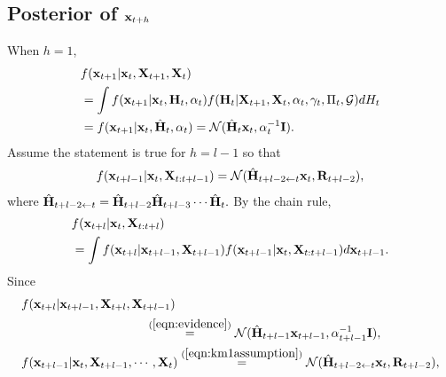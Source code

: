 \documentclass[journal]{IEEEtran}
\begin{document}
\subsection{Posterior of ${\bf{x}}_{t+h}$}\label{apdx:prediction}
When $h=1$,
\begin{equation}\label{eqn:evidence}
\begin{aligned}
&f({\bf{x}}_{t+1}|{\bf{x}}_t,{\bf{X}}_{t+1},{\bf{X}}_t)
\\&=\int f({\bf{x}}_{t+1}|{\bf{x}}_t,{\bf{H}}_t,\alpha_t)f({\bf{H}}_t|{\bf{X}}_{t+1},{\bf{X}}_t,\alpha_t,\gamma_t,\Pi_t,\mathcal{G})d{H}_t
\\&=f({\bf{x}}_{t+1}|{\bf{x}}_t,\hat {\bf{H}}_t,\alpha_t)=\mathcal{N}(\hat {\bf{H}}_t{\bf{x}}_t,\alpha_t^{-1}{\bf{I}}).
\end{aligned}
\end{equation}
Assume the statement is true for $h=l-1$ so that
\begin{equation}\label{eqn:km1assumption}
\begin{aligned}
f({\bf{x}}_{t+l-1}|{\bf{x}}_t,{\bf{X}}_{t:t+l-1})=\mathcal{N}(\hat {\bf{H}}_{t+l-2\leftarrow t}{\bf{x}}_t,{\bf{R}}_{t+l-2}),
\end{aligned}
\end{equation}
where $\hat {\bf{H}}_{t+l-2\leftarrow t}=\hat {\bf{H}}_{t+l-2}\hat {\bf{H}}_{t+l-3}\cdots \hat {\bf{H}}_{t}.$ By the chain rule,
\begin{equation}
    \begin{aligned}
&f({\bf{x}}_{t+l}|{\bf{x}}_t,{\bf{X}}_{t:t+l})\\
&=\int f({\bf{x}}_{t+l}|{\bf{x}}_{t+l-1},{\bf{X}}_{t+l-1}) f({\bf{x}}_{t+l-1}|{\bf{x}}_t,{\bf{X}}_{t:t+l-1})d{\bf{x}}_{t+l-1}.
\end{aligned}
\end{equation}
Since
\begin{equation}
    \begin{aligned}&f({\bf{x}}_{t+l}|{\bf{x}}_{t+l-1},{\bf{X}}_{t+l},{\bf{X}}_{t+l-1})
    \\&\qquad\qquad\qquad\qquad\qquad\overset{(\ref{eqn:evidence})}{=}\mathcal{N}(\hat {\bf{H}}_{t+l-1}{\bf{x}}_{t+l-1},\alpha_{t+l-1}^{-1}{\bf{I}}),\\
&f({\bf{x}}_{t+l-1}|{\bf{x}}_t,{\bf{X}}_{t+l-1},\cdots,{\bf{X}}_t)\overset{(\ref{eqn:km1assumption})}{=}\mathcal{N}(\hat {\bf{H}}_{t+l-2\leftarrow t}{\bf{x}}_t,{\bf{R}}_{t+l-2}),
\end{aligned}
\end{equation}
\end{document}
